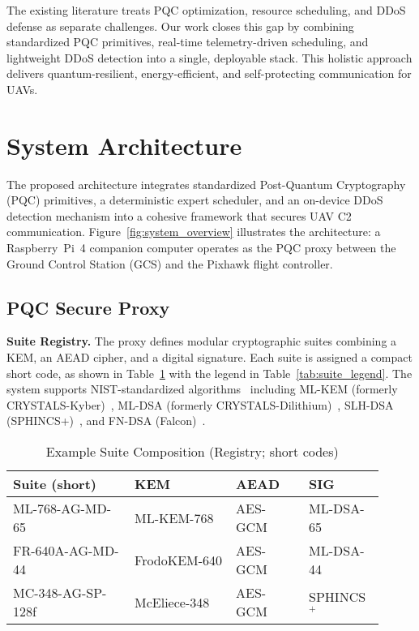 \documentclass[sigconf,natbib=false]{acmart}
\begin{document}
The existing literature treats PQC optimization, resource scheduling, and DDoS defense as separate challenges. Our work closes this gap by combining standardized PQC primitives, real-time telemetry-driven scheduling, and lightweight DDoS detection into a single, deployable stack. This holistic approach delivers quantum-resilient, energy-efficient, and self-protecting communication for UAVs.


\section{System Architecture}

The proposed architecture integrates standardized Post-Quantum Cryptography (PQC) primitives, a deterministic expert scheduler, and an on-device DDoS detection mechanism into a cohesive framework that secures UAV C2 communication. Figure~\ref{fig:system_overview} illustrates the architecture: a Raspberry~Pi~4 companion computer operates as the PQC proxy between the Ground Control Station (GCS) and the Pixhawk flight controller.

\subsection{PQC Secure Proxy}

\textbf{Suite Registry.}
The proxy defines modular cryptographic suites combining a KEM, an AEAD cipher, and a digital signature. Each suite is assigned a compact short code, as shown in Table~\ref{tab:suite_registry} with the legend in Table~\ref{tab:suite_legend}. The system supports NIST-standardized algorithms~\cite{nist_fips_203_2024,nist_fips_204_2024,nist_fips_205_2024} including ML-KEM (formerly CRYSTALS-Kyber)~\cite{bos2018kyber}, ML-DSA (formerly CRYSTALS-Dilithium)~\cite{ducas2018dilithium}, SLH-DSA (SPHINCS+)~\cite{bernstein2019sphincsplus}, and FN-DSA (Falcon)~\cite{prest2019falcon,fips206_status_2025}.

\begin{table}[ht]
\centering
\caption{Example Suite Composition (Registry; short codes)}
\label{tab:suite_registry}
\begingroup
\small
\setlength{\tabcolsep}{3pt}
\begin{tabular}{@{}p{0.30\linewidth}p{0.25\linewidth}p{0.18\linewidth}p{0.18\linewidth}@{}}
\toprule
\textbf{Suite (short)} & \textbf{KEM} & \textbf{AEAD} & \textbf{SIG} \\
\midrule
ML-768-AG-MD-65 & ML-KEM-768 & AES-GCM & ML-DSA-65 \\
FR-640A-AG-MD-44 & FrodoKEM-640 & AES-GCM & ML-DSA-44 \\
MC-348-AG-SP-128f & McEliece-348 & AES-GCM & SPHINCS$^+$ \\
\bottomrule
\end{tabular}
\endgroup
\end{table}
\end{document}
